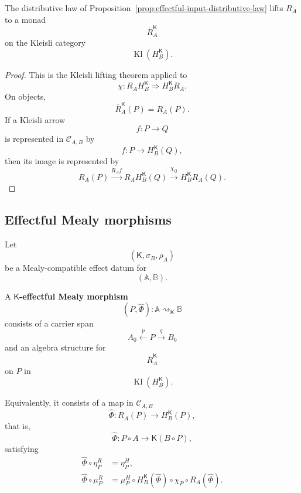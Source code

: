 \begin{corollary}
\label{cor:effectful-lifted-input-monad}
    The distributive law of
    Proposition~\ref{prop:effectful-input-distributive-law} lifts \(R_A\) to a
    monad
    \[
        \overline R_A^{\mathsf K}
    \]
    on the Kleisli category
    \[
        \operatorname{Kl}(H_B^{\mathsf K}).
    \]
\end{corollary}
\begin{proof}
    This is the Kleisli lifting theorem applied to
    \[
        \chi:
        R_AH_B^{\mathsf K}
        \Rightarrow
        H_B^{\mathsf K}R_A.
    \]
    On objects,
    \[
        \overline R_A^{\mathsf K}(P)=R_A(P).
    \]
    If a Kleisli arrow
    \[
        f:P\to Q
    \]
    is represented in \(\mathcal C_{A,B}\) by
    \[
        f:P\to H_B^{\mathsf K}(Q),
    \]
    then its image is represented by
    \[
        R_A(P)
        \xrightarrow{R_Af}
        R_AH_B^{\mathsf K}(Q)
        \xrightarrow{\chi_Q}
        H_B^{\mathsf K}R_A(Q).
    \]
\end{proof}

\subsection{Effectful Mealy morphisms}
\label{subsec:effectful-mealy-morphisms-definition}

\begin{definition}
\label{def:effectful-mealy-morphism}
    Let
    \[
        (\mathsf K,\sigma_B,\rho_A)
    \]
    be a Mealy-compatible effect datum for
    \[
        (\mathbb A,\mathbb B).
    \]

    A \textbf{\(\mathsf K\)-effectful Mealy morphism}
    \[
        (P,\widehat\Phi):
        \mathbb A\rightsquigarrow_{\mathsf K}\mathbb B
    \]
    consists of a carrier span
    \[
        A_0\xleftarrow{p}P\xrightarrow{q}B_0
    \]
    and an algebra structure for
    \[
        \overline R_A^{\mathsf K}
    \]
    on \(P\) in
    \[
        \operatorname{Kl}(H_B^{\mathsf K}).
    \]

    Equivalently, it consists of a map in
    \(\mathcal C_{A,B}\)
    \[
        \widehat\Phi:
        R_A(P)
        \longrightarrow
        H_B^{\mathsf K}(P),
    \]
    that is,
    \[
        \widehat\Phi:
        P\circ A
        \longrightarrow
        \mathsf K(B\circ P),
    \]
    satisfying
    \begin{align}
        \widehat\Phi\circ\eta^R_P
        &=
        \eta^H_P,
        \label{eq:effectful-mealy-unit-abstract}
        \\
        \widehat\Phi\circ\mu^R_P
        &=
        \mu^H_P
        \circ
        H_B^{\mathsf K}(\widehat\Phi)
        \circ
        \chi_P
        \circ
        R_A(\widehat\Phi).
        \label{eq:effectful-mealy-multiplication-abstract}
    \end{align}
\end{definition}

